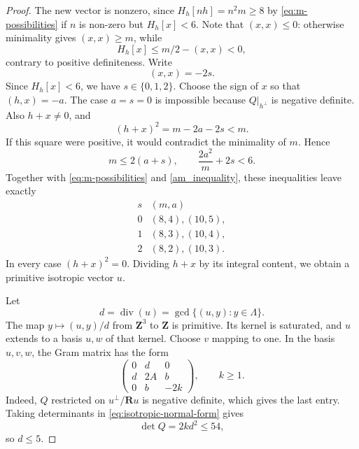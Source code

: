 \documentclass[12pt]{amsart}
\numberwithin{equation}{section}
\theoremstyle{definition}
\theoremstyle{remark}
\newcommand{\Z}{\mathbf Z}
\newcommand{\R}{\mathbf R}
\begin{document}
\begin{proof}
The new vector is nonzero, since $H_h[nh] = n^2m\geq 8$ by \eqref{eq:m-possibilities} if $n$ is non-zero but $H_h[x]<6$. Note that  $(x,x)\leq 0$: otherwise
minimality gives $(x,x)\geq m$, while
\[
                  H_h[x]\leq m/2-(x,x)<0,
\]
contrary to positive definiteness.  Write
$$
                              (x,x)=-2s.
$$
Since $H_h[x]<6$, we have $s\in\{0,1,2\}$.  Choose the sign of $x$ so
that $(h,x)=-a$.  The case $a=s=0$ is impossible because $Q\vert_{h^\perp}$ is
negative definite.  Also $h+x\neq0$, and
\[
                         (h+x)^2=m-2a-2s<m.
\]
If this square were positive, it would contradict the minimality of
$m$.  Hence
\begin{equation}\label{eq:minimality-inequalities}
                  m\leq2(a+s),
          \qquad \frac{2a^2}{m}+2s<6.
\end{equation}
Together with \eqref{eq:m-possibilities} and \eqref{am_inequality}, these inequalities leave
exactly
\[
\begin{array}{c|c}
 s&(m,a)\\ \hline
 0&(8,4),(10,5),\\
 1&(8,3),(10,4),\\
 2&(8,2),(10,3).
\end{array}
\]
In every case $(h+x)^2=0$.  Dividing $h+x$ by its integral content,
we obtain a primitive isotropic vector $u$.

Let
\[
                   d=\operatorname{div}(u)
                     =\gcd\{(u,y):y\in\Lambda\}.
\]
The map $y\mapsto(u,y)/d$ from $\Z^3$ to $\Z$ is primitive.
Its kernel is saturated, and $u$ extends to a basis $u,w$ of that
kernel.  Choose $v$ mapping to one.  In the basis $u,v,w$, the Gram
matrix has the form
\begin{equation}\label{eq:isotropic-normal-form}
 \begin{pmatrix}
  0&d&0\\
  d&2A&b\\
  0&b&-2k
 \end{pmatrix},
 \qquad k\geq1.
\end{equation}
Indeed, $Q$ restricted on $u^\perp/\R u$ is negative definite, which gives the last
entry.  Taking determinants in \eqref{eq:isotropic-normal-form} gives
\[
                         \det Q=2kd^2\leq54,
\]
so $d\leq5$.  


\end{proof}
\end{document}
